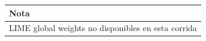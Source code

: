 \begin{tabular}{l}
\toprule
Nota \\
\midrule
LIME global weights no disponibles en esta corrida \\
\bottomrule
\end{tabular}
